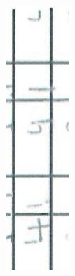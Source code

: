 \documentclass[10pt]{article}
\begin{document}
\includegraphics[max width=\textwidth, center]{2025_02_27_dd68c3d38de88f0516d9g-019(7)}\\
\end{document}
